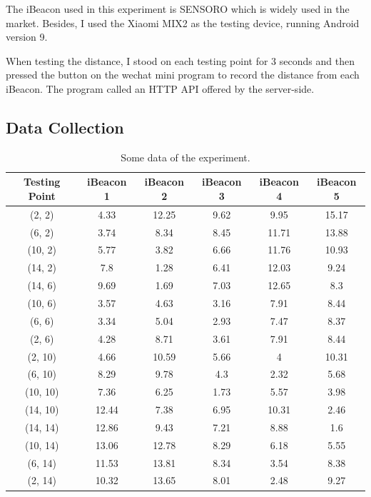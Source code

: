 \documentclass{sigchi}
\newcommand\tabhead[1]{\small\textbf{#1}}
\newcommand\tabhead[1]{\small\textbf{#1}}
\begin{document}
The iBeacon used in this experiment is SENSORO which is widely used in the market. Besides, I used the Xiaomi MIX2 as the testing device, running Android version 9.

When testing the distance, I stood on each testing point for 3 seconds and then pressed the button on the wechat mini program to record the distance from each iBeacon. The program called an HTTP API offered by the server-side. 

\subsection{Data Collection}


\begin{table}[!h]
  \centering
  \begin{tabular}{|c|c|c|c|c|c|}
    \hline
    \tabhead {Testing Point} &
   \multicolumn{1}{|p{0.1\columnwidth}|}{\centering\tabhead{iBeacon 1 }} &
    \multicolumn{1}{|p{0.1\columnwidth}|}{\centering\tabhead{iBeacon 2 }} &
    \multicolumn{1}{|p{0.1\columnwidth}|}{\centering\tabhead{iBeacon 3 }} &
    \multicolumn{1}{|p{0.1\columnwidth}|}{\centering\tabhead{iBeacon 4 }} &
    \multicolumn{1}{|p{0.1\columnwidth}|}{\centering\tabhead{iBeacon 5 }} \\
    \hline
    (2, 2) & 4.33&12.25& 9.62& 9.95& 15.17 \\
    \hline
    (6, 2) & 3.74& 8.34& 8.45& 11.71& 13.88 \\
    \hline
    (10, 2) & 5.77 & 3.82 & 6.66 & 11.76 & 10.93 \\
    \hline
    (14, 2) & 7.8 & 1.28 & 6.41 & 12.03 & 9.24 \\
    \hline
    (14, 6) &9.69 & 1.69& 7.03& 12.65&8.3  \\
    \hline
    (10, 6) & 3.57& 4.63&3.16 &7.91 &8.44  \\
    \hline
    (6, 6) & 3.34&5.04 &2.93 &7.47 & 8.37 \\
    \hline
    (2, 6) &4.28 &8.71 & 3.61&7.91 &8.44  \\
    \hline
    (2, 10) &4.66 & 10.59& 5.66&4 &10.31  \\
    \hline
    (6, 10) & 8.29&9.78 &4.3 &2.32 & 5.68 \\
    \hline
    (10, 10) &7.36 &6.25 &1.73 &5.57 &3.98  \\
    \hline
    (14, 10) &12.44 &7.38 &6.95 & 10.31&2.46  \\
    \hline
    (14, 14) & 12.86& 9.43&7.21 &8.88 &1.6  \\
    \hline
    (10, 14) &13.06 &12.78 & 8.29&6.18 &5.55  \\
    \hline
    (6, 14) & 11.53& 13.81&8.34 &3.54 & 8.38 \\
    \hline
    (2, 14) & 10.32&13.65 &8.01 &2.48 &9.27  \\
    \hline
  \end{tabular}
  \caption{Some data of the experiment.}
  \label{tab:table1}
\end{table}
\end{document}
